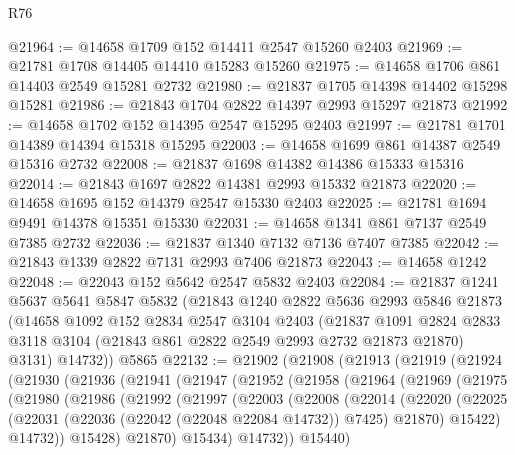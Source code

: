 \begin{lexlean}{R76}
\begin{coremodule}
@21964 := @14658 @1709 @152 @14411 @2547 @15260 @2403
@21969 := @21781 @1708 @14405 @14410 @15283 @15260
@21975 := @14658 @1706 @861 @14403 @2549 @15281 @2732
@21980 := @21837 @1705 @14398 @14402 @15298 @15281
@21986 := @21843 @1704 @2822 @14397 @2993 @15297 @21873
@21992 := @14658 @1702 @152 @14395 @2547 @15295 @2403
@21997 := @21781 @1701 @14389 @14394 @15318 @15295
@22003 := @14658 @1699 @861 @14387 @2549 @15316 @2732
@22008 := @21837 @1698 @14382 @14386 @15333 @15316
@22014 := @21843 @1697 @2822 @14381 @2993 @15332 @21873
@22020 := @14658 @1695 @152 @14379 @2547 @15330 @2403
@22025 := @21781 @1694 @9491 @14378 @15351 @15330
@22031 := @14658 @1341 @861 @7137 @2549 @7385 @2732
@22036 := @21837 @1340 @7132 @7136 @7407 @7385
@22042 := @21843 @1339 @2822 @7131 @2993 @7406 @21873
@22043 := @14658 @1242
@22048 := @22043 @152 @5642 @2547 @5832 @2403
@22084 := @21837
    @1241
    @5637
    @5641
    @5847
    @5832
    (@21843
      @1240
      @2822
      @5636
      @2993
      @5846
      @21873
      (@14658
        @1092
        @152
        @2834
        @2547
        @3104
        @2403
        (@21837
          @1091
          @2824
          @2833
          @3118
          @3104
          (@21843 @861 @2822 @2549 @2993 @2732 @21873 @21870)
          @3131)
        @14732))
    @5865
@22132 := @21902
    (@21908
      (@21913
        (@21919
          (@21924
            (@21930
              (@21936
                (@21941
                  (@21947
                    (@21952
                      (@21958
                        (@21964
                          (@21969
                            (@21975
                              (@21980
                                (@21986
                                  (@21992
                                    (@21997
                                      (@22003
                                        (@22008
                                          (@22014
                                            (@22020
                                              (@22025
                                                (@22031
                                                  (@22036 (@22042 (@22048 @22084 @14732)) @7425)
                                                  @21870)
                                                @15422)
                                              @14732))
                                          @15428)
                                        @21870)
                                      @15434)
                                    @14732))
                                @15440)

\end{coremodule}
\end{lexlean}
